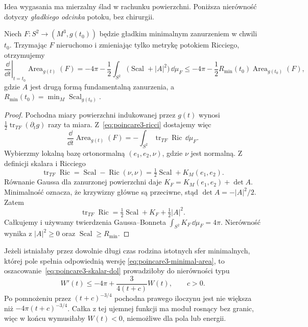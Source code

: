 Idea wygasania ma mierzalny ślad w rachunku
powierzchni. Poniższa nierówność dotyczy
\emph{gładkiego odcinka} potoku, bez chirurgii.

\begin{stwierdzenie}
\label{prop:poincare3-minimal-area}
Niech $F:S^2\to(M^3,g(t_0))$ będzie gładkim
minimalnym zanurzeniem w chwili $t_0$.
Trzymając $F$ nieruchomo i zmieniając tylko
metrykę potokiem Ricciego, otrzymujemy
\begin{equation}\label{eq:poincare3-minimal-area}
 \left.\frac{\dd}{\dd t}\right|_{t=t_0}
 \operatorname{Area}_{g(t)}(F)
 =-4\pi-\frac12\int_{S^2}
   \bigl(\operatorname{Scal}+|A|^2\bigr)\,\dd\mu_F
 \leq-4\pi-\frac12R_{\min}(t_0)
                 \operatorname{Area}_{g(t_0)}(F),
\end{equation}
gdzie $A$ jest drugą formą fundamentalną
zanurzenia, a
$R_{\min}(t_0)=\min_M\operatorname{Scal}_{g(t_0)}$.
\end{stwierdzenie}
\begin{proof}
Pochodna miary powierzchni indukowanej
przez $g(t)$ wynosi
$\frac12\operatorname{tr}_{TF}(\partial_tg)$
razy ta miara. Z~\eqref{eq:poincare3-ricci}
dostajemy więc
\[
 \frac{\dd}{\dd t}\operatorname{Area}_{g(t)}(F)
 =-\int_{S^2}\operatorname{tr}_{TF}
                    \operatorname{Ric}\,\dd\mu_F.
\]
Wybierzmy lokalną bazę ortonormalną
$(e_1,e_2,\nu)$, gdzie $\nu$ jest normalną.
Z definicji skalara i Ricciego
\[
 \operatorname{tr}_{TF}\operatorname{Ric}
 =\operatorname{Scal}-\operatorname{Ric}(\nu,\nu)
 =\tfrac12\operatorname{Scal}+K_M(e_1,e_2).
\]
Równanie Gaussa dla zanurzonej powierzchni daje
$K_F=K_M(e_1,e_2)+\det A$.
Minimalność oznacza, że krzywizny główne
są przeciwne, stąd $\det A=-|A|^2/2$.
Zatem
\[
 \operatorname{tr}_{TF}\operatorname{Ric}
 =\tfrac12\operatorname{Scal}+K_F
                   +\tfrac12|A|^2.
\]
Całkujemy i używamy twierdzenia Gaussa--Bonneta
$\int_{S^2}K_F\,\dd\mu_F=4\pi$.
Nierówność wynika z $|A|^2\geq0$ oraz
$\operatorname{Scal}\geq R_{\min}$.
\end{proof}

Jeżeli istniałaby przez dowolnie długi czas
rodzina istotnych sfer minimalnych, której
pole spełnia odpowiednią wersję
\eqref{eq:poincare3-minimal-area}, to
oszacowanie~\eqref{eq:poincare3-skalar-dol}
prowadziłoby do nierówności typu
\[
 W'(t)\leq-4\pi+
 \frac{3}{4(t+c)}W(t),\qquad c>0.
\]
Po pomnożeniu przez $(t+c)^{-3/4}$
pochodna prawego iloczynu jest nie większa
niż $-4\pi(t+c)^{-3/4}$. Całka z tej
ujemnej funkcji ma moduł rosnący bez granic,
więc w końcu wymusiłaby $W(t)<0$,
niemożliwe dla pola lub energii.

